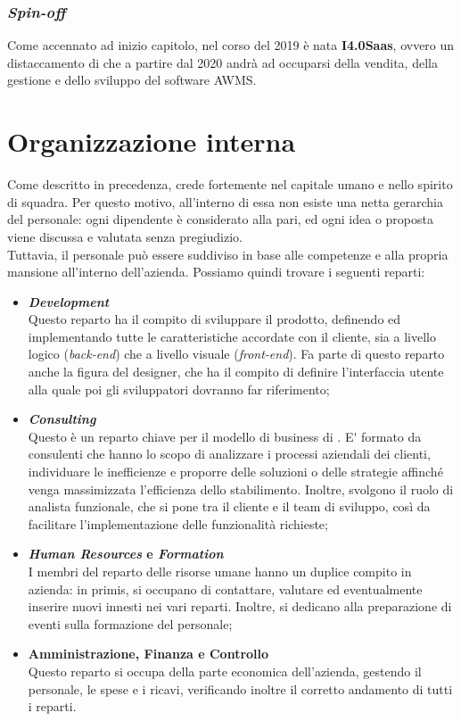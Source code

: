 \subsubsection*{\textit{Spin-off}}
Come accennato ad inizio capitolo, nel corso del 2019 è nata \textbf{I4.0Saas}, ovvero un distaccamento di \AD{} che a partire dal 2020 andrà ad occuparsi della vendita, della gestione e dello sviluppo del software AWMS.

\section{Organizzazione interna}
Come descritto in precedenza, \AD{} crede fortemente nel capitale umano e nello spirito di squadra. Per questo motivo, all'interno di essa non esiste una netta gerarchia del personale: ogni dipendente è considerato alla pari, ed ogni idea o proposta viene discussa e valutata senza pregiudizio. \\
Tuttavia, il personale può essere suddiviso in base alle competenze e alla propria mansione all'interno dell'azienda. Possiamo quindi trovare i seguenti reparti:
\begin{itemize}
\item \textbf{\textit{Development}}\\
Questo reparto ha il compito di sviluppare il prodotto, definendo ed implementando tutte le caratteristiche accordate con il cliente, sia a livello logico (\textit{back-end}) che a livello visuale (\textit{front-end}). Fa parte di questo reparto anche la figura del designer, che ha il compito di definire l'interfaccia utente alla quale poi gli sviluppatori dovranno far riferimento;  
\item \textbf{\textit{Consulting}}\\
Questo è un reparto chiave per il modello di business di \AD{}. E\'{} formato da consulenti che hanno lo scopo di analizzare i processi aziendali dei clienti, individuare le inefficienze e proporre delle soluzioni o delle strategie affinché venga massimizzata l'efficienza dello stabilimento. Inoltre, svolgono il ruolo di analista funzionale, che si pone tra il cliente e il team di sviluppo, così da facilitare l'implementazione delle funzionalità richieste;
\item \textbf{\textit{Human Resources} e \textit{Formation}}\\
I membri del reparto delle risorse umane hanno un duplice compito in azienda: in primis, si occupano di contattare, valutare ed eventualmente inserire nuovi innesti nei vari reparti. Inoltre, si dedicano alla preparazione di eventi sulla formazione del personale;
\item \textbf{Amministrazione, Finanza e Controllo}\\
Questo reparto si occupa della parte economica dell'azienda, gestendo il personale, le spese e i ricavi, verificando inoltre il corretto andamento di tutti i reparti.
\end{itemize}

